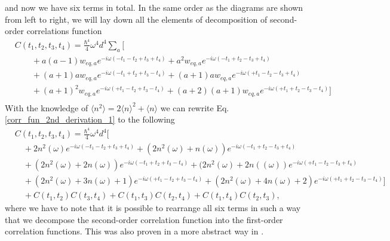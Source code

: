
\noindent and now we have six terms in total. In the same order as the diagrams are shown from left to right, we will lay down all the elements of decomposition of second-order correlations function 
\begin{equation}
\label{corr_fun_2nd_derivation_1}
    \begin{aligned}
        &C(t_1, t_2, t_3, t_4) = \frac{\hbar^4}{4} \omega^4d^4 \sum_{a} \big[ \\
        &\quad\quad +a(a-1)w_{eq, a} e^{ - i \omega (-t_1-t_2+t_3+t_4)}+a^2w_{eq, a} e^{ - i \omega (-t_1+t_2-t_3+t_4)} \\
        &\quad\quad +(a+1)a w_{eq, a} e^{ - i \omega (-t_1+t_2+t_3-t_4)} + (a+1)aw_{eq, a} e^{ - i \omega (+t_1-t_2-t_3+t_4)} \\
        &\quad\quad +(a+1)^2 w_{eq, a} e^{ - i \omega (+t_1-t_2+t_3-t_4)} + (a+2)(a+1) w_{eq, a} e^{ - i \omega (+t_1+t_2-t_3-t_4)} \big] \\
    \end{aligned}
\end{equation}
With the knowledge of $\langle n^2\rangle=2\langle n \rangle^2+\langle n\rangle$ we can rewrite Eq. \ref{corr_fun_2nd_derivation_1} to the following
\begin{equation}
\label{corr_fun_2nd_derivation_2}
    \begin{aligned}
        &C(t_1, t_2, t_3, t_4) = \frac{\hbar^4}{4} \omega^4d^4 \big[ \\
        &\quad + 2n^2(\omega) e^{ - i \omega (-t_1-t_2+t_3+t_4)} + (2n^2(\omega) + n(\omega)) e^{ - i \omega (-t_1+t_2-t_3+t_4)} \\
        &\quad + (2n^2(\omega) + 2n(\omega)) e^{ - i \omega (-t_1+t_2+t_3-t_4)} + (2n^2(\omega) + 2n((\omega)) e^{ - i \omega (+t_1-t_2-t_3+t_4)} \\
        &\quad + (2n^2(\omega) + 3n(\omega) +1) e^{ - i \omega (+t_1-t_2+t_3-t_4)} + (2n^2(\omega) + 4n(\omega) +2) e^{ - i \omega (+t_1+t_2-t_3-t_4)} \big] \\
        &\quad + C(t_1, t_2)C(t_3, t_4) + C(t_1, t_3)C(t_2, t_4) + C(t_1, t_4)C(t_2, t_3),
    \end{aligned}
\end{equation}
where we have to note that it is possible to rearrange all six terms in such a way that we decompose the second-order correlation function into the first-order correlation functions. This was also proven in a more abstract way in \cite{fox_gaussian_1978}.


